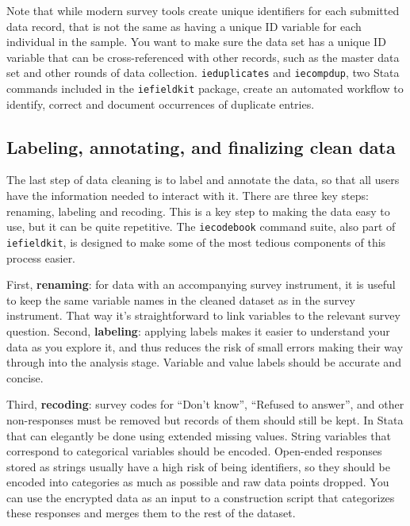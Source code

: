 Note that while modern survey tools create unique identifiers for each submitted data record,
that is not the same as having a unique ID variable for each individual in the sample.
You want to make sure the data set has a unique ID variable
that can be cross-referenced with other records, such as the master data set
and other rounds of data collection.
\texttt{ieduplicates} and \texttt{iecompdup},
two Stata commands included in the \texttt{iefieldkit}
package,
create an automated workflow to identify, correct and document
occurrences of duplicate entries.

\subsection{Labeling, annotating, and finalizing clean data}

The last step of data cleaning is to label and annotate the data,
so that all users have the information needed to interact with it.
There are three key steps: renaming, labeling and recoding.
This is a key step to making the data easy to use, but it can be quite repetitive.
The \texttt{iecodebook} command suite, also part of \texttt{iefieldkit},
is designed to make some of the most tedious components of this process easier.

First, \textbf{renaming}: for data with an accompanying survey instrument,
it is useful to keep the same variable names in the cleaned dataset as in the survey instrument.
That way it's straightforward to link variables to the relevant survey question.
Second, \textbf{labeling}: applying labels makes it easier to understand your data as you explore it,
and thus reduces the risk of small errors making their way through into the analysis stage.
Variable and value labels should be accurate and concise.

Third, \textbf{recoding}: survey codes for ``Don't know'', ``Refused to answer'', and
other non-responses must be removed but records of them should still be kept. In Stata that can elegantly be done using extended missing values.
String variables that correspond to categorical variables should be encoded.
Open-ended responses stored as strings usually have a high risk of being identifiers,
so they should be encoded into categories as much as possible and raw data points dropped.
You can use the encrypted data as an input to a construction script
that categorizes these responses and merges them to the rest of the dataset.

